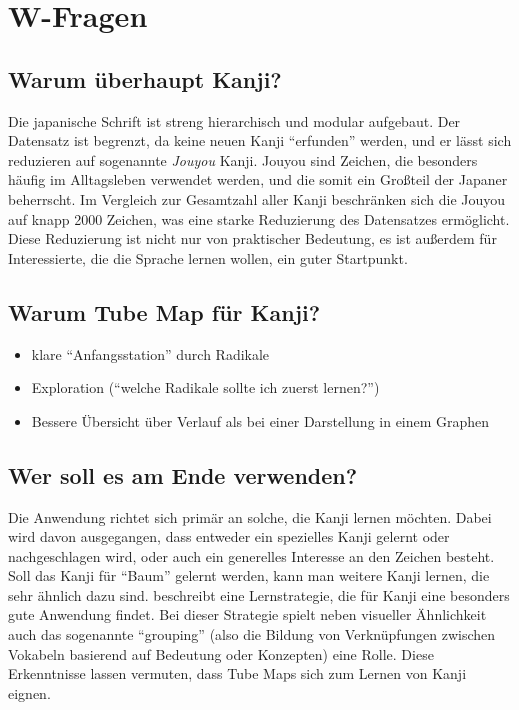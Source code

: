 \documentclass[color,german]{tudbook}
\begin{document}
\chapter{W-Fragen}
\section{Warum überhaupt Kanji?}
Die japanische Schrift ist streng hierarchisch und modular aufgebaut. Der Datensatz ist begrenzt, da keine neuen Kanji "`erfunden"' werden, und er lässt sich reduzieren auf sogenannte \emph{Jouyou} Kanji. Jouyou sind Zeichen, die besonders häufig im Alltagsleben verwendet werden, und die somit ein Großteil der Japaner beherrscht. Im Vergleich zur Gesamtzahl aller Kanji beschränken sich die Jouyou auf knapp 2000 Zeichen, was eine starke Reduzierung des Datensatzes ermöglicht.
Diese Reduzierung ist nicht nur von praktischer Bedeutung, es ist außerdem für Interessierte, die die Sprache lernen wollen, ein guter Startpunkt. 

\section{Warum Tube Map für Kanji?}
\begin{itemize}
\item klare "`Anfangsstation"' durch Radikale
\item Exploration ("`welche Radikale sollte ich zuerst lernen?"')
\item Bessere Übersicht über Verlauf als bei einer Darstellung in einem Graphen
\end{itemize}

\section{Wer soll es am Ende verwenden?}
Die Anwendung richtet sich primär an solche, die Kanji lernen möchten. Dabei wird davon ausgegangen, dass entweder ein spezielles Kanji gelernt oder nachgeschlagen wird, oder auch ein generelles Interesse an den Zeichen besteht. Soll das Kanji für "`Baum"' gelernt werden, kann man weitere Kanji lernen, die sehr ähnlich dazu sind. 
\cite{kanjilearningjapanese10} beschreibt eine Lernstrategie, die für Kanji eine besonders gute Anwendung findet. Bei dieser Strategie spielt neben visueller Ähnlichkeit auch das sogenannte "`grouping"' (also die Bildung von Verknüpfungen zwischen Vokabeln basierend auf Bedeutung oder Konzepten) eine Rolle. 
Diese Erkenntnisse lassen vermuten, dass Tube Maps sich zum Lernen von Kanji eignen.
\end{document}
